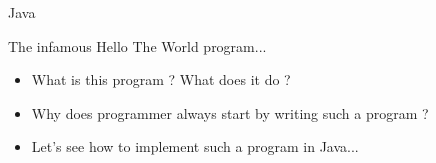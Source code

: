 {  \begin{frame}{Java}
    \begin{block}{The infamous Hello The World program...}
      \begin{itemize}
        \item What is this program ? What does it do ?
        \item Why does programmer always start by writing such a program ?
        \item Let's see how to implement such a program in Java...
      \end{itemize}
    \end{block}
  \end{frame}
}
